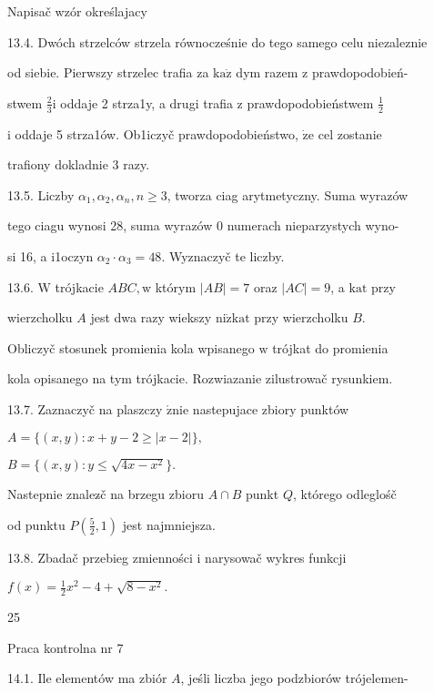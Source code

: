 \documentclass[a4paper,12pt]{article}
\begin{document}
Napisač wzór określajacy

13.4. Dwóch strzelców strzela równocześnie do tego samego celu niezaleznie

od siebie. Pierwszy strzelec trafia za $\mathrm{k}\mathrm{a}\dot{\mathrm{z}}$ dym razem $\mathrm{z}$ prawdopodobień-

stwem $\displaystyle \frac{2}{3}\mathrm{i}$ oddaje 2 strza1y, a drugi trafia $\mathrm{z}$ prawdopodobieństwem $\displaystyle \frac{1}{2}$

$\mathrm{i}$ oddaje 5 strza1ów. Ob1iczyč prawdopodobieństwo, $\dot{\mathrm{z}}\mathrm{e}$ cel zostanie

trafiony dokladnie 3 razy.

13.5. Liczby $\alpha_{1}, \alpha_{2}, \alpha_{n}, n\geq 3$, tworza ciag arytmetyczny. Suma wyrazów

tego ciagu wynosi 28, suma wyrazów $0$ numerach nieparzystych wyno-

si 16, a i1oczyn $\alpha_{2}\cdot\alpha_{3}=48$. Wyznaczyč te liczby.

13.6. $\mathrm{W}$ trójkacie $ABC, \mathrm{w}$ którym $|AB| = 7$ oraz $|AC| =9$, a $\mathrm{k}\mathrm{a}\mathrm{t}$ przy

wierzcholku $A$ jest dwa razy wiekszy $\mathrm{n}\mathrm{i}\dot{\mathrm{z}} \mathrm{k}\mathrm{a}\mathrm{t}$ przy wierzcholku $B.$

Obliczyč stosunek promienia kola wpisanego $\mathrm{w}$ trójkat do promienia

kola opisanego na tym trójkacie. Rozwiazanie zilustrowač rysunkiem.

13.7. Zaznaczyč na plaszczy $\acute{\mathrm{z}}\mathrm{n}\mathrm{i}\mathrm{e}$ nastepujace zbiory punktów

$A=\{(x,y):x+y-2\geq|x-2|\},$

$B=\{(x,y):y\leq\sqrt{4x-x^{2}}\}.$

Nastepnie znalez$\acute{}$č na brzegu zbioru $A\cap B$ punkt $Q$, którego odleglośč

od punktu $P(\displaystyle \frac{5}{2},1)$ jest najmniejsza.

13.8. Zbadač przebieg zmienności $\mathrm{i}$ narysowač wykres funkcji

$f(x)=\displaystyle \frac{1}{2}x^{2}-4+\sqrt{8-x^{2}}.$





25

Praca kontrolna nr 7

14.1. Ile elementów ma zbiór $A$, jeśli liczba jego podzbiorów trójelemen-
\end{document}
